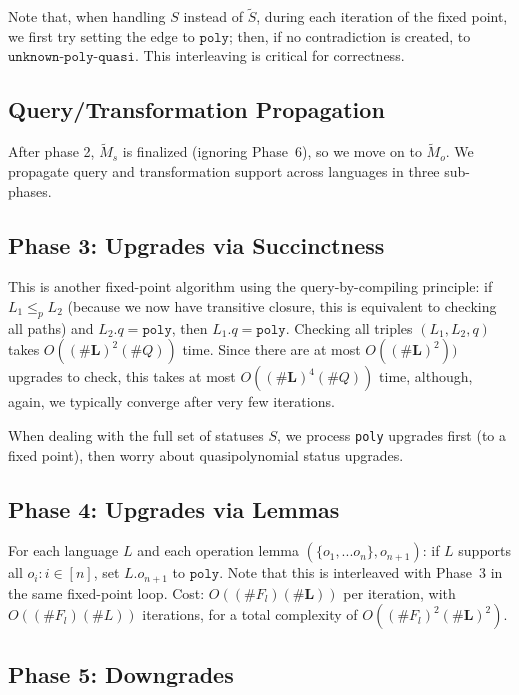 \documentclass[10pt]{article}
\theoremstyle{plain}
\theoremstyle{definition}
\theoremstyle{remark}
\begin{document}
Note that, when handling $S$ instead of $\tilde S$, during each iteration of the fixed point, we first try setting the edge to $\texttt{poly}$; then, if no contradiction is created, to $\texttt{unknown-poly-quasi}$. This interleaving is critical for correctness.

\subsection{Query/Transformation Propagation}

After phase 2, $\widetilde M_s$ is finalized (ignoring Phase~6), so we move on to $\widetilde M_o$. We propagate query and transformation support across languages in three sub-phases.

\subsection{Phase 3: Upgrades via Succinctness}

This is another fixed-point algorithm using the query-by-compiling principle: if $L_1 \leq_p L_2$ (because we now have transitive closure, this is equivalent to checking all paths) and $L_2.q = \texttt{poly}$, then $L_1.q = \texttt{poly}$. Checking all triples $(L_1, L_2, q)$ takes $O((\#\textbf{L})^2(\#Q))$ time. Since there are at most $O((\#\textbf{L})^2))$ upgrades to check, this takes at most $O((\#\textbf{L})^4(\#Q))$ time, although, again, we typically converge after very few iterations.

When dealing with the full set of statuses $S$, we process \texttt{poly} upgrades first (to a fixed point), then worry about quasipolynomial status upgrades.

\subsection{Phase 4: Upgrades via Lemmas}

For each language $L$ and each operation lemma $(\{o_1,...o_n\}, o_{n+1})$: if $L$ supports all $o_i: i \in [n]$, set $L.o_{n+1}$ to $\texttt{poly}$. Note that this is interleaved with Phase~3 in the same fixed-point loop. Cost: $O((\#F_l)(\#\textbf{L}))$ per iteration, with $O((\#F_l)(\#L))$ iterations, for a total complexity of $O((\#F_l)^2(\#\textbf{L})^2)$.
\subsection{Phase 5: Downgrades}
\end{document}
